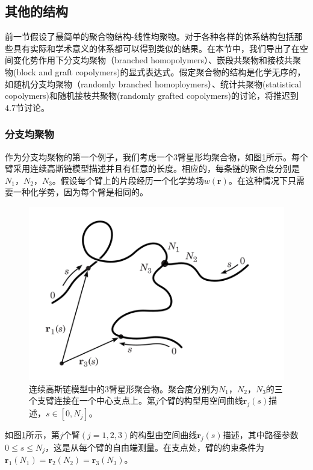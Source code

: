\subsection{其他的结构}
前一节假设了最简单的聚合物结构-线性均聚物。对于各种各样的体系结构包括那些具有实际和学术意义的体系都可以得到类似的结果。在本节中，我们导出了在空间变化势作用下分支均聚物（branched homopolymers）、嵌段共聚物和接枝共聚物(block and graft copolymers)的显式表达式。假定聚合物的结构是化学无序的，如随机分支均聚物（randomly branched homoploymers）、统计共聚物(statistical copolymers)和随机接枝共聚物(randomly grafted copolymers)的讨论，将推迟到$4.7$节讨论。
\subsubsection{分支均聚物}
作为分支均聚物的第一个例子，我们考虑一个$3$臂星形均聚合物，如图\ref{三臂星形均聚物}所示。每个臂采用连续高斯链模型描述并且有任意的长度。相应的，每条链的聚合度分别是$N_1$，$N_2$，$N_3$。假设每个臂上的片段经历一个化学势场$w (\mathbf{r})$。在这种情况下只需要一种化学势，因为每个臂是相同的。
\begin{figure}[H]
\centering
\includegraphics[scale=0.7]{./figures/34.png}
\caption{连续高斯链模型中的$3$臂星形聚合物。聚合度分别为$N_1$，$N_2$，$N_3$的三个支臂连接在一个中心支点上。第$j$个臂的构型用空间曲线$\mathbf{r}_j(s)$描述，$s\in [0,N_j]$。}
\label{三臂星形均聚物}
\end{figure}

如图\ref{三臂星形均聚物}所示，第$j$个臂$(j=1,2,3)$的构型由空间曲线$\mathbf{r}_j(s)$描述，其中路径参数$0\leq s\leq N_j$，这是从每个臂的自由端测量。在支点处，臂的约束条件为$\mathbf{r}_1(N_1)=\mathbf{r}_2(N_2)=\mathbf{r}_3(N_3)$。


